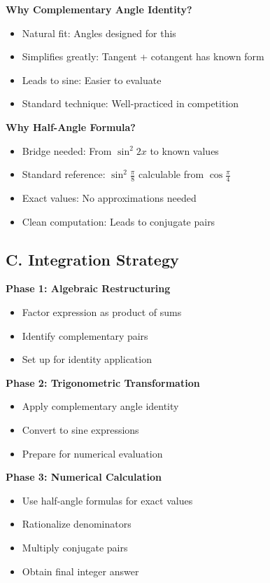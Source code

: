 \documentclass[12pt]{article}
\begin{document}
\begin{techniquesbox}
\textbf{Why Complementary Angle Identity?}
\begin{itemize}
    \item Natural fit: Angles designed for this
    \item Simplifies greatly: Tangent + cotangent has known form
    \item Leads to sine: Easier to evaluate
    \item Standard technique: Well-practiced in competition
\end{itemize}

\textbf{Why Half-Angle Formula?}
\begin{itemize}
    \item Bridge needed: From $\sin^2 2x$ to known values
    \item Standard reference: $\sin^2\frac{\pi}{8}$ calculable from $\cos\frac{\pi}{4}$
    \item Exact values: No approximations needed
    \item Clean computation: Leads to conjugate pairs
\end{itemize}

\subsection*{C. Integration Strategy}

\textbf{Phase 1: Algebraic Restructuring}
\begin{itemize}
    \item Factor expression as product of sums
    \item Identify complementary pairs
    \item Set up for identity application
\end{itemize}

\textbf{Phase 2: Trigonometric Transformation}
\begin{itemize}
    \item Apply complementary angle identity
    \item Convert to sine expressions
    \item Prepare for numerical evaluation
\end{itemize}

\textbf{Phase 3: Numerical Calculation}
\begin{itemize}
    \item Use half-angle formulas for exact values
    \item Rationalize denominators
    \item Multiply conjugate pairs
    \item Obtain final integer answer
\end{itemize}


\end{techniquesbox}
\end{document}
